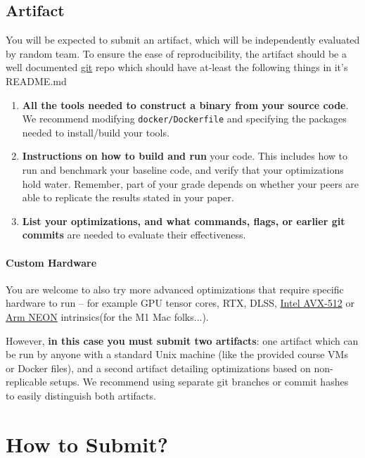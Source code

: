 \documentclass[11pt]{article}
\newcommand{\1}{ \mathbb{1} }
\begin{document}
\subsection{Artifact}
\label{subsec:artifact}
You will be expected to submit an artifact, which will be independently evaluated by random team. To ensure the ease of reproducibility, the artifact should be a well documented \href{https://git-scm.com/}{git} repo which should have at-least the following things in it's README.md

\begin{enumerate}
    \item \textbf{All the tools needed to construct a binary from your source code}. We recommend modifying \texttt{docker/Dockerfile} and specifying the packages needed to install/build your tools. 
    \item \textbf{Instructions on how to build and run} your code. This includes how to run and benchmark your baseline code, and verify that your optimizations hold water. Remember, part of your grade depends on whether your peers are able to replicate the results stated in your paper. 
    \item \textbf{List your optimizations, and what commands, flags, or earlier git commits} are needed to evaluate their effectiveness.
\end{enumerate}

\paragraph{Custom Hardware} You are welcome to also try more advanced optimizations that require specific hardware to run -- for example GPU tensor cores, RTX, DLSS, \href{https://www.intel.com/content/www/us/en/docs/intrinsics-guide/index.html#techs=AVX_512}{Intel AVX-512} or \href{https://developer.arm.com/architectures/instruction-sets/intrinsics/#f:@navigationhierarchiessimdisa=[Neon]&f:@navigationhierarchiesinstructiongroup=[Vector%20arithmetic]}{Arm NEON} intrinsics(for the M1 Mac folks...). 

However, \textbf{in this case you must submit two artifacts}: one artifact which can be run by anyone with a standard Unix machine (like the provided course VMs or Docker files), and a second artifact detailing optimizations based on non-replicable setups. We recommend using separate git branches or commit hashes to easily distinguish both artifacts.

\section{How to Submit?}
\end{document}
